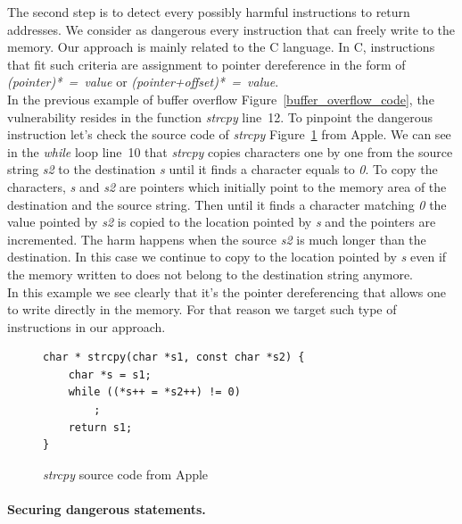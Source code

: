 \documentclass[11pt]{sdm}
\begin{document}
The second step is to detect every possibly harmful instructions to return addresses. We consider as dangerous every instruction that can freely write to the memory. Our approach is mainly related to the C language.
In C, instructions that fit such criteria are assignment to pointer dereference in the form of  \textit{(pointer)*~=~value} or \textit{(pointer+offset)*~=~value}. \\
In the previous example of buffer overflow Figure~\ref{buffer_overflow_code}, the vulnerability resides in the function \textit{strcpy} line~12. To pinpoint the dangerous instruction let's check the source code of \textit{strcpy} Figure~\ref{strcpy} from Apple.
We can see in the \textit{while} loop line~10 that \textit{strcpy} copies characters one by one from the source string \textit{s2} to the destination \textit{s} until it finds a character equals to \textit{0}.
To copy the characters, \textit{s} and \textit{s2} are pointers which initially point to the memory area of the destination and the source string. Then until it finds a character matching \textit{0} the value pointed by \textit{s2} is copied to the location pointed by \textit{s} and the pointers are incremented. The harm happens when the source \textit{s2} is much longer than the destination. In this case we continue to copy to the location pointed by \textit{s} even if the memory written to does not belong to the destination string anymore.\\
In this example we see clearly that it's the pointer dereferencing that allows one to write directly in the memory. For that reason we target such type of instructions in our approach.

\begin{figure}[!ht]
\begin{lstlisting}
char * strcpy(char *s1, const char *s2) {
	char *s = s1;
	while ((*s++ = *s2++) != 0)
		;
	return s1;
}
\end{lstlisting}
\centering
\caption{\textit{strcpy} source code from Apple}
\label{strcpy}
\end{figure}

\paragraph{Securing dangerous statements.}
\label{par:Protection around dangerous statements}
\end{document}
